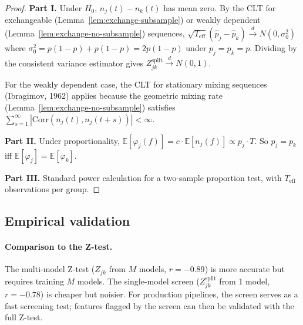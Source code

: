 \documentclass{article}
\begin{document}
\begin{proof}
\textbf{Part I.}
Under $H_0$, $n_j(t) - n_k(t)$ has mean zero. By the CLT for
exchangeable (Lemma~\ref{lem:exchange-subsample}) or weakly
dependent (Lemma~\ref{lem:exchange-no-subsample}) sequences,
$\sqrt{T_{\text{eff}}}(\hat{p}_j - \hat{p}_k) \xrightarrow{d}
N(0, \sigma_0^2)$ where $\sigma_0^2 = p(1-p) + p(1-p) = 2p(1-p)$
under $p_j = p_k = p$. Dividing by the consistent variance
estimator gives $Z^{\text{split}}_{jk} \xrightarrow{d} N(0,1)$.

For the weakly dependent case, the CLT for stationary mixing
sequences (Ibragimov, 1962) applies because the geometric
mixing rate (Lemma~\ref{lem:exchange-no-subsample}) satisfies
$\sum_{s=1}^\infty |\text{Corr}(n_j(t), n_j(t+s))| < \infty$.

\textbf{Part II.}
Under proportionality, $\mathbb{E}[\varphi_j(f)] =
c \cdot \mathbb{E}[n_j(f)] \propto p_j \cdot T$. So $p_j = p_k$
iff $\mathbb{E}[\varphi_j] = \mathbb{E}[\varphi_k]$.

\textbf{Part III.}
Standard power calculation for a two-sample proportion test,
with $T_{\text{eff}}$ observations per group.
\end{proof}

\subsection{Empirical validation}

\paragraph{Comparison to the Z-test.}
The multi-model Z-test ($Z_{jk}$ from $M$ models, $r = -0.89$) is more
accurate but requires training $M$ models.
The single-model screen ($Z^{\text{split}}_{jk}$ from 1 model, $r = -0.78$)
is cheaper but noisier.
For production pipelines, the screen serves as a fast screening test; features
flagged by the screen can then be validated with the full Z-test.
\end{document}
